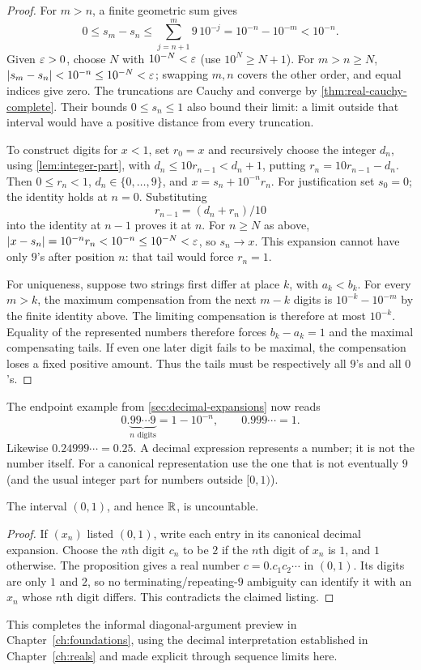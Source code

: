 \begin{proof}
For $m>n$, a finite geometric sum gives
\[
0\leq s_m-s_n\leq\sum_{j=n+1}^m9\,10^{-j}
=10^{-n}-10^{-m}<10^{-n}.
\]
Given $\varepsilon>0$, choose $N$ with $10^{-N}<\varepsilon$ (use $10^N\geq N+1$).
For $m>n\geq N$,
$|s_m-s_n|<10^{-n}\leq10^{-N}<\varepsilon$; swapping $m,n$ covers the other
order, and equal indices give zero. The truncations are Cauchy and converge by \cref{thm:real-cauchy-complete}.
Their bounds $0\leq s_n\leq1$ also bound their limit: a limit outside that
interval would have a positive distance from every truncation.

To construct digits for $x<1$, set $r_0=x$ and recursively choose the
integer $d_n$, using \cref{lem:integer-part}, with $d_n\leq10r_{n-1}<d_n+1$, putting
$r_n=10r_{n-1}-d_n$. Then $0\leq r_n<1$, $d_n\in\{0,\ldots,9\}$,
and $x=s_n+10^{-n}r_n$. For justification set $s_0=0$; the identity
holds at $n=0$. Substituting
\[
r_{n-1}=(d_n+r_n)/10
\]
 into the
identity at $n-1$ proves it at $n$. For $n\geq N$ as above,
$|x-s_n|=10^{-n}r_n<10^{-n}\leq10^{-N}<\varepsilon$, so $s_n\to x$. This expansion cannot have
only $9$'s after position $n$: that tail would force $r_n=1$.

For uniqueness, suppose two strings first differ at place $k$, with
$a_k<b_k$. For every $m>k$, the maximum compensation from the next
$m-k$ digits is $10^{-k}-10^{-m}$ by the finite identity above.
The limiting compensation is therefore at most $10^{-k}$.
Equality of the represented numbers
therefore forces $b_k-a_k=1$ and the maximal compensating tails. If even
one later digit fails to be maximal, the compensation loses a fixed positive
amount. Thus the tails must be respectively all $9$'s and all $0$'s.
\end{proof}

The endpoint example from \cref{sec:decimal-expansions} now reads
\[
0.\underbrace{99\cdots9}_{n\text{ digits}}=1-10^{-n},
\qquad 0.999\cdots=1.
\]
Likewise $0.24999\cdots=0.25$. A decimal expression represents a number;
it is not the number itself. For a canonical representation use the one
that is not eventually $9$ (and the usual integer part for numbers outside
$[0,1)$).

\begin{theorem}
\label{thm:cantor-formal}
The interval $(0,1)$, and hence $\mathbb{R}$, is uncountable.
\end{theorem}
\begin{proof}
If $(x_n)$ listed $(0,1)$, write each entry in its canonical decimal
expansion. Choose the $n$th digit $c_n$ to be $2$ if the $n$th digit of
$x_n$ is $1$, and $1$ otherwise. The proposition gives a real
number $c=0.c_1c_2\cdots$ in $(0,1)$. Its digits are only $1$ and $2$,
so no terminating/repeating-$9$ ambiguity can identify it with an $x_n$
whose $n$th digit differs. This contradicts the claimed listing.
\end{proof}
This completes the informal diagonal-argument preview in
Chapter~\ref{ch:foundations}, using the decimal interpretation established
in Chapter~\ref{ch:reals} and made explicit through sequence limits here.

